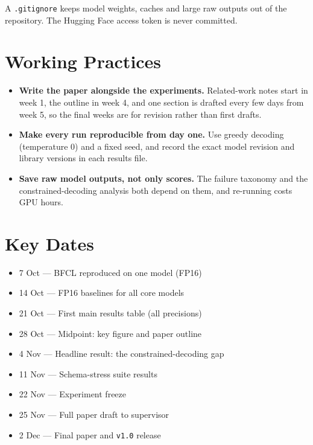 \documentclass[11pt,a4paper]{article}
\begin{document}
A \texttt{.gitignore} keeps model weights, caches and large raw outputs out of the repository.
The Hugging Face access token is never committed.

\section{Working Practices}

\begin{itemize}
  \item \textbf{Write the paper alongside the experiments.} Related-work notes start in week 1, the
        outline in week 4, and one section is drafted every few days from week 5, so the final
        weeks are for revision rather than first drafts.
  \item \textbf{Make every run reproducible from day one.} Use greedy decoding (temperature 0) and a
        fixed seed, and record the exact model revision and library versions in each results file.
  \item \textbf{Save raw model outputs, not only scores.} The failure taxonomy and the
        constrained-decoding analysis both depend on them, and re-running costs GPU hours.
\end{itemize}

\section{Key Dates}

\begin{itemize}[label=$\square$]
  \item 7 Oct --- BFCL reproduced on one model (FP16)
  \item 14 Oct --- FP16 baselines for all core models
  \item 21 Oct --- First main results table (all precisions)
  \item 28 Oct --- Midpoint: key figure and paper outline
  \item 4 Nov --- Headline result: the constrained-decoding gap
  \item 11 Nov --- Schema-stress suite results
  \item 22 Nov --- Experiment freeze
  \item 25 Nov --- Full paper draft to supervisor
  \item 2 Dec --- Final paper and \texttt{v1.0} release
\end{itemize}
\end{document}
